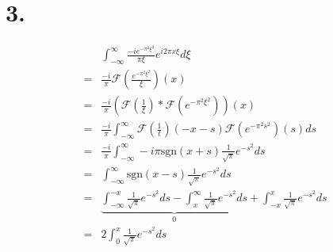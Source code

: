 \documentclass[11pt]{article}
\theoremstyle{mystyle}
\theoremstyle{definition}
\begin{document}
\section*{3.}
\begin{align*}
  &\int_{-\infty}^\infty \displaystyle\frac{-ie^{-\pi^2 \xi^2}}{\pi \xi} e^{i 2\pi x \xi} d\xi \\
  =& \displaystyle\frac{-i}{\pi} \mathcal{F}\left( \displaystyle\frac{e^{-\pi^2 \xi^2}}{\xi}\right)(x) \\
  =& \displaystyle\frac{-i}{\pi} \left(\mathcal{F}\left(\displaystyle\frac{1}{\xi}\right) * \mathcal{F}\left(e^{-\pi^2 \xi^2}\right)\right) (x) \\
  =& \displaystyle\frac{-i}{\pi} \int_{-\infty}^\infty \mathcal{F}\left(\displaystyle\frac{1}{t}\right)(-x-s) \mathcal{F}(e^{-\pi^2 s^2})(s) ds \\
  =& \displaystyle\frac{-i}{\pi} \int_{-\infty}^\infty -i\pi \text{sgn}(x+s) \displaystyle\frac{1}{\sqrt{\pi}} e^{-s^2} ds \\
  =& \int_{-\infty}^\infty \text{sgn}(x-s) \displaystyle\frac{1}{\sqrt{\pi}} e^{-s^2} ds \\
  =& \underbrace{\int_{-\infty}^{-x}  \displaystyle\frac{1}{\sqrt{\pi}} e^{-s^2} ds 
  - \int_{x}^\infty  \displaystyle\frac{1}{\sqrt{\pi}} e^{-s^2} ds}_{0} + \int_{-x}^x  \displaystyle\frac{1}{\sqrt{\pi}} e^{-s^2} ds \\
  =& 2 \int_{0}^{x}  \displaystyle\frac{1}{\sqrt{\pi}} e^{-s^2} ds 
\end{align*}
\clearpage 
\end{document}
